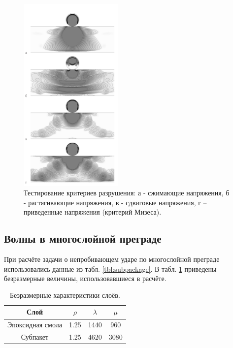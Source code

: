 \begin{figure}[htp]
\centering
\includegraphics[width=0.45\textwidth]{png/destruction_test.png}
\caption{Тестирование критериев разрушения: а - сжимающие напряжения, б - растягивающие напряжения, в - сдвиговые напряжения, г – приведенные напряжения (критерий Мизеса).}
\label{pic:destruction_test}
\end{figure}

\clearpage
\newpage

\subsection{Волны в многослойной преграде}

При расчёте задачи о непробивающем ударе по многослойной преграде использовались
данные из табл. \ref{tbl:subpackage}. В табл. \ref{tbl:subpackage_2} приведены
безразмерные величины, использовавшиеся в расчёте.
\begin{table}[h]
\centering
\begin{tabular}{|c|c|c|c|}
\hline
Слой & $\rho$ & $\lambda$ & $\mu$  \\
\hline
Эпоксидная смола & 1.25 & 1440 & 960 \\
Субпакет & 1.25 & 4620 & 3080 \\
\hline
\end{tabular}
\caption{Безразмерные характеристики слоёв.}
\label{tbl:subpackage_2}
\end{table}

